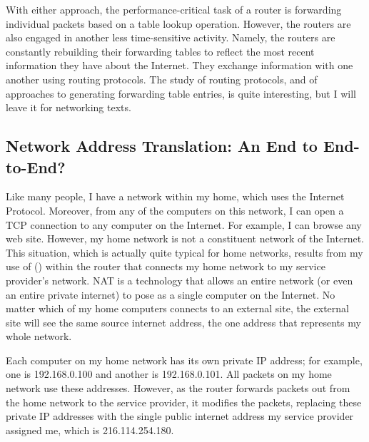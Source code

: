 With either approach, the performance-critical task of a router is
forwarding individual packets based on a table lookup operation.
However, the routers are also engaged in another less time-sensitive activity.
Namely, the
routers are constantly rebuilding their forwarding tables to reflect
the most recent information they have about the Internet.  They
exchange information with one another using routing protocols.  The
study of routing protocols, and of approaches to generating forwarding
table entries, is quite interesting, but I will leave it for networking
texts.

\subsection{Network Address Translation: An End to End-to-End?}
\label{nat-section}

Like many people, I have a network within my home, which uses the
Internet Protocol.  Moreover, from any of the computers on this
network, I can open a TCP connection to any computer on the Internet.
For example, I can browse any web site.  However, my home network is not
a constituent network of the Internet.  This situation, which is actually quite typical
for home networks, results from my use of  () within the router that connects my home
network to my service provider's network.  NAT is a technology that
allows an entire network (or even an entire private internet) to pose
as a single computer on the Internet.  No matter which of my home
computers connects to an external site, the external site will see the
same source internet address, the one address that represents my whole
network.

Each computer on my home network has its own private IP address; for
example, one is 192.168.0.100 and another is 192.168.0.101.  All
packets on my home network use these addresses.  However, as the
router forwards packets out from the home network to the service
provider, it modifies the packets, replacing these private IP addresses
with the single public internet address my service provider assigned
me, which is 216.114.254.180.

